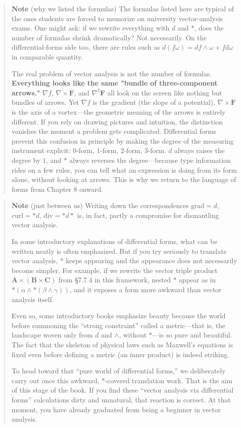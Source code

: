 \documentclass[a4paper,12pt,openany]{book}
\begin{document}
\begin{quote}
\textbf{Note} (why we listed the formulas) The formulas listed here are
typical of the ones students are forced to memorize on university
vector-analysis exams. One might ask: if we rewrite everything with
\(d\) and \(\ast\), does the number of formulas shrink dramatically? Not
necessarily. On the differential-forms side too, there are rules such as
\(d(f\omega) = df\wedge\omega + f d\omega\) in comparable quantity.

The real problem of vector analysis is not the number of formulas.
\textbf{Everything looks like the same "bundle of three-component arrows."}
\(\nabla f\), \(\nabla \times \mathbf{F}\), and \(\nabla^2\mathbf{F}\)
all look on the screen like nothing but bundles of arrows. Yet
\(\nabla f\) is the gradient (the slope of a potential),
\(\nabla \times \mathbf{F}\) is the axis of a vortex—the geometric
meaning of the arrows is entirely different. If you rely on drawing
pictures and intuition, the distinction vanishes the moment a problem
gets complicated. Differential forms prevent this confusion in principle
by making the degree of the measuring instrument explicit: \(0\)-form,
\(1\)-form, \(2\)-form, \(3\)-form. \(d\) always raises the degree by
\(1\), and \(\ast\) always reverses the degree—because type
information rides on a few rules, you can tell what an expression is
doing from its form alone, without looking at arrows. This is why we
return to the language of forms from Chapter 8 onward.
\end{quote}

\begin{quote}
\textbf{Note} (just between us) Writing down the correspondences
\(\mathrm{grad}=d\), \(\mathrm{curl}=\ast d\),
\(\mathrm{div}=\ast d\ast\) is, in fact, partly a compromise for
dismantling vector analysis.

In some introductory explanations of differential forms, what can be
written neatly is often emphasized. But if you try seriously to
translate vector analysis, \(\ast\) keeps appearing and the appearance
does not necessarily become simpler. For example, if we rewrite the
vector triple product \(\mathbf{A}\times(\mathbf{B}\times\mathbf{C})\)
from §7.7.4 in this framework, nested \(\ast\) appear as in
\(\ast(\alpha \wedge \ast(\beta \wedge \gamma))\), and it exposes a form
more awkward than vector analysis itself.

Even so, some introductory books emphasize beauty because the world
before summoning the ``strong constraint'' called a metric—that is,
the landscape woven only from \(d\) and \(\wedge\), without
\(\ast\)—is so pure and beautiful. The fact that the skeleton of
physical laws such as Maxwell's equations is fixed even before defining
a metric (an inner product) is indeed striking.

To head toward that ``pure world of differential forms,'' we
deliberately carry out once this awkward, \(\ast\)-covered translation
work. That is the aim of this stage of the book. If you find these
``vector analysis via differential forms'' calculations dirty and
unnatural, that reaction is correct. At that moment, you have already
graduated from being a beginner in vector analysis.
\end{quote}
\end{document}
